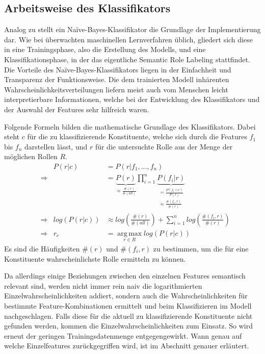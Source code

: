 \documentclass[12pt]{article}
\begin{document}
\subsection{Arbeitsweise des Klassifikators}

Analog zu \cite{gildea} stellt ein Naïve-Bayes-Klassifikator die Grundlage der Implementierung dar. Wie bei überwachten maschinellen Lernverfahren üblich, gliedert sich diese in eine Trainingsphase, also die Erstellung des Modells, und eine Klassifikationsphase, in der das eigentliche Semantic Role Labeling stattfindet. Die Vorteile des Naïve-Bayes-Klassifikators liegen in der Einfachheit und Transparenz der Funktionsweise. Die dem trainierten Modell inhärenten Wahrscheinlichkeitsverteilungen liefern meist auch vom Menschen leicht interpretierbare Informationen, welche bei der Entwicklung des Klassifikators und der Auswahl der Features sehr hilfreich waren. 


Folgende Formeln bilden die mathematische Grundlage des Klassifikators. Dabei steht $c$ für die zu klassifizierende Konstituente, welche sich durch die Features $f_1$ bis $f_n$ darstellen lässt, und $r$ für die untersuchte Rolle aus der Menge der möglichen Rollen $R$.
\begin{align}
& & P(r|c)&=P(r|f_1,...,f_n)\\
&\Rightarrow & &=\underbrace{P(r)}_{\approx \frac{\#(r)}{\#(all)}}\prod_{i=1}^n \underbrace{P(f_i|r)}_{\substack{=\frac{P(f_i\cap r)}{P(r)}\\\approx\frac{\#(f_i, r)}{\#(r)}}}\\
&\Rightarrow & log(P(r|c))&\approx log\left(\frac{\#(r)}{\#(all)}\right) + \sum_{i=1}^n log\left(\frac{\#(f_i, r)}{\#(r)}\right)\label{mat:norm}\\
&\Rightarrow & r_c &= \operatorname*{arg\,max}_{r \in R} log(P(r|c))
\end{align}
Es sind die Häufigkeiten $\#(r)$ und $\#(f_i, r)$ zu bestimmen, um die für eine Konstituente wahrscheinlichste Rolle ermitteln zu können.

Da allerdings einige Beziehungen zwischen den einzelnen Features semantisch relevant sind, werden nicht immer rein naiv die logarithmierten Einzelwahrscheinlichkeiten addiert, sondern auch die Wahrscheinlichkeiten für bestimmte Feature-Kombinationen ermittelt und beim Klassifizieren im Modell nachgeschlagen. Falls diese für die aktuell zu klassifizierende Konstituente nicht gefunden werden, kommen die Einzelwahrscheinlichkeiten zum Einsatz. So wird erneut der geringen Trainingsdatenmenge entgegengewirkt. Wann genau auf welche Einzelfeatures zurückgegriffen wird, ist im Abschnitt  genauer erläutert.
\end{document}
